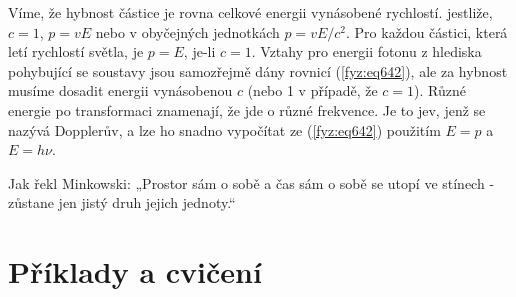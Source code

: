     Víme, že hybnost částice je rovna celkové energii vynásobené rychlostí. jestliže, \(c=1\), \(p =
    vE\) nebo v obyčejných jednotkách \( p=vE/c^2\). Pro každou částici, která letí rychlostí
    světla, je \(p=E\), je-li \(c=1\). Vztahy pro energii fotonu z hlediska pohybující se soustavy
    jsou samozřejmě dány rovnicí (\ref {fyz:eq642}), ale za hybnost musíme dosadit energii
    vynásobenou \(c\) (nebo \num{1} v případě, že \(c=1\)). Různé energie po transformaci znamenají,
    že jde o různé frekvence. Je to jev, jenž se nazývá Dopplerův, a lze ho snadno vypočítat ze
    (\ref {fyz:eq642}) použitím \(E=p\) a \(E=hν\).

    Jak řekl Minkowski: „Prostor sám o sobě a čas sám o sobě se utopí ve stínech - zůstane jen jistý
    druh jejich jednoty.“

  \section{Příklady a cvičení}\label{fyz:IchapXVIIsecVI}
